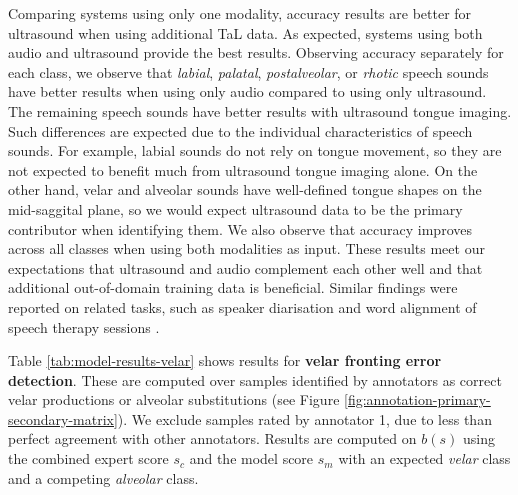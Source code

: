 Comparing systems using only one modality, accuracy results are better for ultrasound when using additional TaL data.
As expected, systems using both audio and ultrasound provide the best results.
Observing accuracy separately for each class, we observe that \emph{labial}, \emph{palatal}, \emph{postalveolar}, or \emph{rhotic} speech sounds have better results when using only audio compared to using only ultrasound.
The remaining speech sounds have better results with ultrasound tongue imaging.
Such differences are expected due to the individual characteristics of speech sounds.
For example, labial sounds do not rely on tongue movement, so they are not expected to benefit much from ultrasound tongue imaging alone.
On the other hand, velar and alveolar sounds have well-defined tongue shapes on the mid-saggital plane, so we would expect ultrasound data to be the primary contributor when identifying them.
We also observe that accuracy improves across all classes when using both modalities as input.
These results meet our expectations that ultrasound and audio complement each other well and that additional out-of-domain training data is beneficial.
Similar findings were reported on related tasks, such as speaker diarisation and word alignment of speech therapy sessions \citep{ribeiro2019ultrasound}.

Table \ref{tab:model-results-velar} shows results for \textbf{velar fronting error detection}.
These are computed over samples identified by annotators as correct velar productions or alveolar substitutions (see Figure \ref{fig:annotation-primary-secondary-matrix}).
We exclude samples rated by annotator 1, due to less than perfect agreement with other annotators.
Results are computed on $b(s)$ using the combined expert score $s_c$ and the model score $s_m$ with an expected \emph{velar} class and a competing \emph{alveolar} class.

